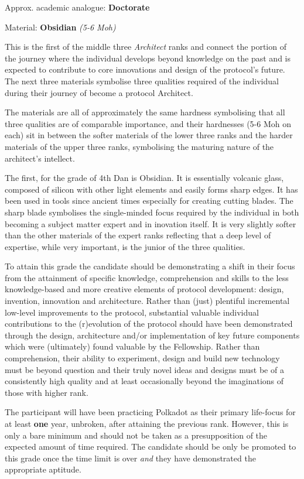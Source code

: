 \documentclass[9pt,oneside]{amsart}
\begin{document}

Approx. academic analogue: \textbf{Doctorate}

Material: \textbf{Obsidian} \emph{(5-6 Moh)}

This is the first of the middle three \emph{Architect} ranks and connect the portion of the journey where the individual develops beyond knowledge on the past and is expected to contribute to core innovations and design of the protocol's future. The next three materials symbolise three qualities required of the individual during their journey of become a protocol Architect.

The materials are all of approximately the same hardness symbolising that all three qualities are of comparable importance, and their hardnesses (5-6 Moh on each) sit in between the softer materials of the lower three ranks and the harder materials of the upper three ranks, symbolising the maturing nature of the architect's intellect.

The first, for the grade of 4th Dan is Obsidian. It is essentially volcanic glass, composed of silicon with other light elements and easily forms sharp edges. It has been used in tools since ancient times especially for creating cutting blades. The sharp blade symbolises the single-minded focus required by the individual in both becoming a subject matter expert and in inovation itself. It is very slightly softer than the other materials of the expert ranks reflecting that a deep level of expertise, while very important, is the junior of the three qualities.

To attain this grade the candidate should be demonstrating a shift in their focus from the attainment of specific knowledge, comprehension and skills to the less knowledge-based and more creative elements of protocol development: design, invention, innovation and architecture. Rather than (just) plentiful incremental low-level improvements to the protocol, substantial valuable individual contributions to the (r)evolution of the protocol should have been demonstrated through the design, architecture and/or implementation of key future components which were (ultimately) found valuable by the Fellowship. Rather than comprehension, their ability to experiment, design and build new technology must be beyond question and their truly novel ideas and designs must be of a consistently high quality and at least occasionally beyond the imaginations of those with higher rank.

The participant will have been practicing Polkadot as their primary life-focus for at least \textbf{one} year, unbroken, after attaining the previous rank. However, this is only a bare minimum and should not be taken as a presupposition of the expected amount of time required. The candidate should be only be promoted to this grade once the time limit is over \emph{and} they have demonstrated the appropriate aptitude.
\end{document}
